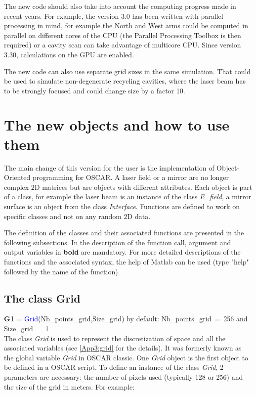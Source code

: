  The new code should also take into account the computing progress made in recent years. For example, the version 3.0 has been written with parallel processing in mind, for example the North and West arms could be computed in parallel on different cores of the CPU (the Parallel Processing Toolbox is then required) or a cavity scan can take advantage of multicore CPU. Since version 3.30, calculations on the GPU are enabled.

 The new code can also use separate grid sizes in the same simulation. That could be used to simulate non-degenerate recycling cavities, where the laser beam has to be strongly focused and could change size by a factor 10.

\section{The new objects and how to use them}

The main change of this version for the user is the implementation of Object-Oriented programming for OSCAR. A laser field or a mirror are no longer complex 2D matrices but are objects with different attributes. Each object is part of a class, for example the laser beam is an instance of the class \textsl{E\_field}, a mirror surface is an object from the class \textsl{Interface}. Functions are defined to work on specific classes and not on any random 2D data.

The definition of the classes and their associated functions are presented in the following subsections. In the description of the function call, argument and output variables in \textbf{bold} are mandatory. For more detailed descriptions of the functions and the associated syntax, the help of Matlab can be used (type "help" followed by the name of the function).

\subsection{The class Grid}

\textbf{G1} = \textcolor{blue}{Grid}(Nb\_points\_grid,Size\_grid)
by default: Nb\_points\_grid~=~256 and Size\_grid~=~1 \\

The class \textsl{Grid} is used to represent the discretization of space and all the associated variables (see \ref{App3:grid} for the details). It was formerly known as the global variable \textsl{Grid} in OSCAR classic. One \textsl{Grid} object is the first object to be defined in a OSCAR script. To define an instance of the class \textsl{Grid}, 2 parameters are necessary: the number of pixels used (typically 128 or 256) and the size of the grid in meters. For example:

